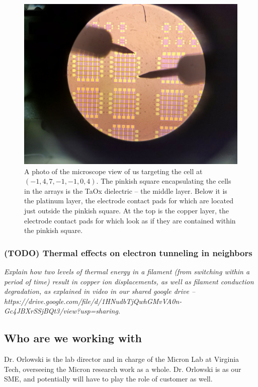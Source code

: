\documentclass{article}
\begin{document}
          \begin{figure}[H]
            \centering
            \includegraphics[width=\textwidth]{figures/microscope_grid_3.jpg}
            \caption{A photo of the microscope view of us targeting the cell at $(-1, 4, 7, -1, -1, 0, 4)$. The pinkish
              square encapsulating the cells in the arrays is the TaOx dielectric -- the middle layer. Below it is the
              platinum layer, the electrode contact pads for which are located just outside the pinkish square. At the
              top is the copper layer, the electrode contact pads for which look as if they are contained within the
              pinkish square.}
            \label{grid_3}
          \end{figure}

        \newpage
        \subsubsection{(TODO) Thermal effects on electron tunneling in neighbors}
            
          \textit{Explain how two levels of thermal energy in a filament (from switching within a period of time) result
            in copper ion displacements, as well as filament conduction degradation, as explained in video in our shared
            google drive -- https://drive.google.com/file/d/1HNudbTjQwhGMvVA0n-Gc4JBXrSSjBQt3/view?usp=sharing.}    
      
      \newpage
      \subsection{Who are we working with}
        Dr. Orlowski is the lab director and in charge of the Micron Lab at Virginia Tech, overseeing the Micron
        research work as a whole. Dr. Orlowski is as our SME, and potentially will have to play the role of customer as
        well.
\end{document}
